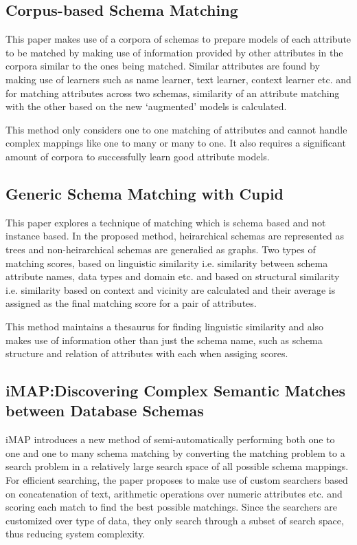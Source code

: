 \documentclass[conference]{IEEEtran}
\begin{document}
\subsection*{\textbf{Corpus-based Schema Matching}\cite{ref4}}
This paper makes use of a corpora of schemas to prepare models of each attribute to be matched by making use of information provided by other attributes in the corpora similar to the ones being matched. Similar attributes are found by making use of learners such as name learner, text learner, context learner etc. and for matching attributes across two schemas, similarity of an attribute matching with the other based on the new `augmented' models is calculated. 

This method only considers one to one matching of attributes and cannot handle complex mappings like one to many or many to one. It also requires a significant amount of corpora to successfully learn good attribute models.


\subsection*{\textbf{Generic Schema Matching with Cupid}\cite{ref3}}
This paper explores a technique of matching which is schema based and not instance based. In the proposed method, heirarchical schemas are represented as trees and non-heirarchical schemas are generalied as graphs. Two types of matching scores, based on linguistic similarity i.e. similarity between schema attribute names, data types and domain etc. and based on structural similarity i.e. similarity based on context and vicinity are calculated and their average is assigned as the final matching score for a pair of attributes.

This method maintains a thesaurus for finding linguistic similarity and also makes use of information other than just the schema name, such as schema structure and relation of attributes with each when assiging scores.


\subsection*{\textbf{iMAP:Discovering Complex Semantic Matches between Database Schemas}\cite{ref5}}
iMAP introduces a new method of semi-automatically performing both one to one and one to many schema matching by converting the matching problem to a search problem in a relatively large search space of all possible schema mappings. For efficient searching, the paper proposes to make use of custom searchers based on concatenation of text, arithmetic operations over numeric attributes etc. and scoring each match to find the best possible matchings. Since the searchers are customized over type of data, they only search through a subset of search space, thus reducing system complexity. 
\end{document}
